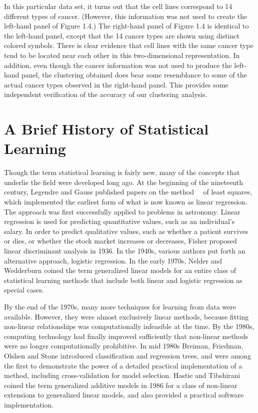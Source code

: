 \documentclass[10pt]{article}
\begin{document}
In this particular data set, it turns out that the cell lines correspond to 14 different types of cancer. (However, this information was not used to create the left-hand panel of Figure 1.4.) The right-hand panel of Figure 1.4 is identical to the left-hand panel, except that the 14 cancer types are shown using distinct colored symbols. There is clear evidence that cell lines with the same cancer type tend to be located near each other in this two-dimensional representation. In addition, even though the cancer information was not used to produce the left-hand panel, the clustering obtained does bear some resemblance to some of the actual cancer types observed in the right-hand panel. This provides some independent verification of the accuracy of our clustering analysis.

\section*{A Brief History of Statistical Learning}
Though the term statistical learning is fairly new, many of the concepts that underlie the field were developed long ago. At the beginning of the nineteenth century, Legendre and Gauss published papers on the method\
\
of least squares, which implemented the earliest form of what is now known as linear regression. The approach was first successfully applied to problems in astronomy. Linear regression is used for predicting quantitative values, such as an individual's salary. In order to predict qualitative values, such as whether a patient survives or dies, or whether the stock market increases or decreases, Fisher proposed linear discriminant analysis in 1936. In the 1940s, various authors put forth an alternative approach, logistic regression. In the early 1970s, Nelder and Wedderburn coined the term generalized linear models for an entire class of statistical learning methods that include both linear and logistic regression as special cases.

By the end of the 1970s, many more techniques for learning from data were available. However, they were almost exclusively linear methods, because fitting non-linear relationships was computationally infeasible at the time. By the 1980s, computing technology had finally improved sufficiently that non-linear methods were no longer computationally prohibitive. In mid 1980s Breiman, Friedman, Olshen and Stone introduced classification and regression trees, and were among the first to demonstrate the power of a detailed practical implementation of a method, including cross-validation for model selection. Hastie and Tibshirani coined the term generalized additive models in 1986 for a class of non-linear extensions to generalized linear models, and also provided a practical software implementation.
\end{document}
